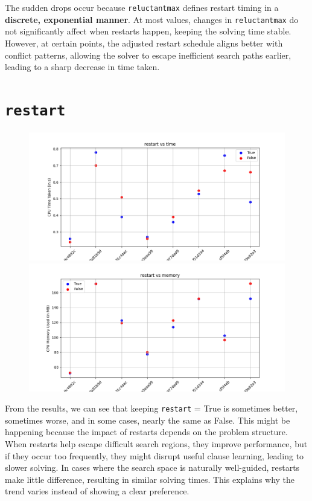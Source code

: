 \documentclass{article}
\begin{document}
    The sudden drops occur because \texttt{reluctantmax} defines restart timing
    in a \textbf{discrete, exponential manner}. At most values, changes in
    \texttt{reluctantmax} do not significantly affect when restarts happen,
    keeping the solving time stable. However, at certain points, the adjusted
    restart schedule aligns better with conflict patterns, allowing the solver
    to escape inefficient search paths earlier, leading to a sharp decrease in
    time taken.

    \section*{\texttt{restart}}
    \begin{figure}[H]
        \centering
        \begin{minipage}{\textwidth}
            \centering
            \includegraphics[width = \linewidth]{restart-0.png}
        \end{minipage}
        \hfill
        \begin{minipage}{\textwidth}
            \centering
            \includegraphics[width = \linewidth]{restart-1.png}
        \end{minipage}
    \end{figure}
    From the results, we can see that keeping \texttt{restart} = True is
    sometimes better, sometimes worse, and in some cases, nearly the same as
    False. This might be happening because the impact of restarts depends on
    the problem structure. When restarts help escape difficult search regions,
    they improve performance, but if they occur too frequently, they might
    disrupt useful clause learning, leading to slower solving. In cases where
    the search space is naturally well-guided, restarts make little difference,
    resulting in similar solving times. This explains why the trend varies
    instead of showing a clear preference.
\end{document}
